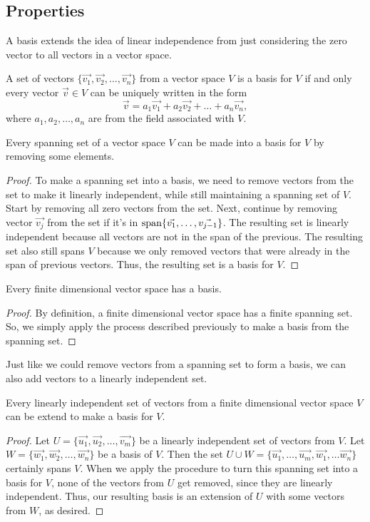 \subsection{Properties}
A basis extends the idea of linear independence from just considering the zero vector to all vectors in a vector space.
\begin{theorem}
	A set of vectors $\{\vec{v_1}, \vec{v_2}, \dots, \vec{v_n}\}$ from a vector space $V$ is a basis for $V$ if and only every vector $\vec{v} \in V$ can be uniquely written in the form
	\begin{equation*}
		\vec{v} = a_1\vec{v_1} + a_2\vec{v_2} + \dots + a_n\vec{v_n},
	\end{equation*}
	where $a_1, a_2, \dots, a_n$ are from the field associated with $V$.
\end{theorem}

\begin{theorem}
	Every spanning set of a vector space $V$ can be made into a basis for $V$ by removing some elements.
\end{theorem}
\begin{proof}
	To make a spanning set into a basis, we need to remove vectors from the set to make it linearly independent, while still maintaining a spanning set of $V$.
	Start by removing all zero vectors from the set.
	Next, continue by removing vector $\vec{v_j}$ from the set if it's in $\operatorname{span}\{\vec{v_1}, \dots, \vec{v_{j-1}}\}$.
	The resulting set is linearly independent because all vectors are not in the span of the previous.
	The resulting set also still spans $V$ because we only removed vectors that were already in the span of previous vectors.
	Thus, the resulting set is a basis for $V$.
\end{proof}

\begin{corollary}
	Every finite dimensional vector space has a basis.
\end{corollary}
\begin{proof}
	By definition, a finite dimensional vector space has a finite spanning set.
	So, we simply apply the process described previously to make a basis from the spanning set.
\end{proof}

Just like we could remove vectors from a spanning set to form a basis, we can also add vectors to a linearly independent set.
\begin{theorem}
	Every linearly independent set of vectors from a finite dimensional vector space $V$ can be extend to make a basis for $V$.
\end{theorem}
\begin{proof}
	Let $U = \{\vec{u_1}, \vec{u_2}, \dots, \vec{v_m}\}$ be a linearly independent set of vectors from $V$.
	Let $W = \{\vec{w_1}, \vec{w_2}, \dots, \vec{w_n}\}$ be a basis of $V$.
	Then the set $U \cup W = \{\vec{u_1}, \dots, \vec{u_m}, \vec{w_1}, \dots \vec{w_n}\}$ certainly spans $V$.
	When we apply the procedure to turn this spanning set into a basis for $V$, none of the vectors from $U$ get removed, since they are linearly independent.
	Thus, our resulting basis is an extension of $U$ with some vectors from $W$, as desired.
\end{proof}